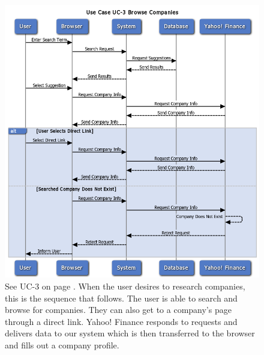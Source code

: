 \begin{figure}
\centering
\includegraphics[width=5.5in]{./Diagrams/SystemSequenceDiagrams/uc3.png}
\caption{See UC-3 on page \pageref{UC-3}. When the user desires to research companies, this is the sequence that follows. The user is able to search and browse for companies. They can also get to a company's page through a direct link. Yahoo! Finance responds to requests and delivers data to our system which is then transferred to the browser and fills out a company profile.}
\end{figure}

